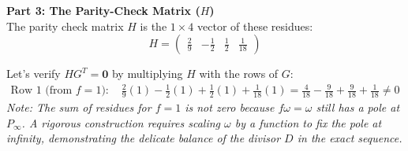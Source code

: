 \documentclass[11pt, a4paper, twoside]{article}
\begin{document}
		\vspace{1em}
		\textbf{Part 3: The Parity-Check Matrix ($H$)}\\
		The parity check matrix $H$ is the $1 \times 4$ vector of these residues:
		$$ H = \begin{pmatrix} \frac{2}{9} & -\frac{1}{2} & \frac{1}{2} & \frac{1}{18} \end{pmatrix} $$
		
		Let's verify $H G^T = \mathbf{0}$ by multiplying $H$ with the rows of $G$:
		\begin{align*}
			\text{Row 1 (from } f=1): \quad & \frac{2}{9}(1) - \frac{1}{2}(1) + \frac{1}{2}(1) + \frac{1}{18}(1) = \frac{4}{18} - \frac{9}{18} + \frac{9}{18} + \frac{1}{18} \neq 0 
		\end{align*}
		\textit{Note: The sum of residues for $f=1$ is not zero because $f\omega = \omega$ still has a pole at $P_\infty$. A rigorous construction requires scaling $\omega$ by a function to fix the pole at infinity, demonstrating the delicate balance of the divisor $D$ in the exact sequence.}
	
\end{document}
